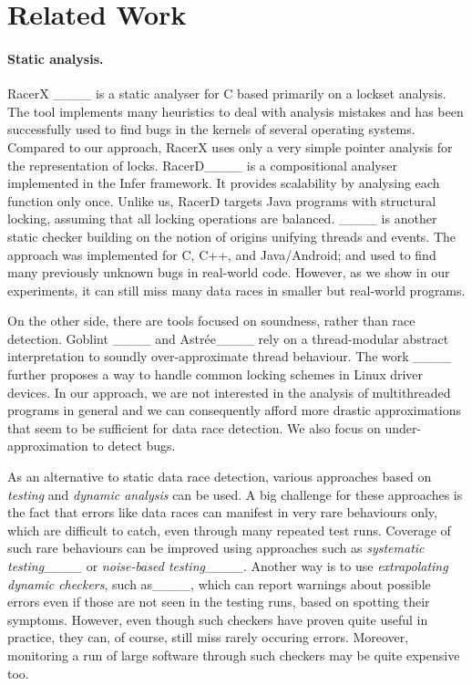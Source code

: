 \section{Related Work}
\vspace*{-1mm}

\paragraph{Static analysis.} RacerX ____ is a static analyser for C
based primarily on a lockset analysis. The tool implements many heuristics to
deal with analysis mistakes and has been successfully used to find bugs in the
kernels of several operating systems. Compared to our approach, RacerX uses only
a very simple pointer analysis for the representation of locks.
RacerD____ is a compositional analyser implemented in the Infer
framework. It provides scalability by analysing each function only once. Unlike
us, RacerD targets Java programs with structural locking, assuming that all
locking operations are balanced. \otwo ____ is another static checker
building on the notion of origins unifying threads and events. The approach was
implemented for C, C++, and Java/Android; and used to find many previously
unknown bugs in real-world code. However, as we show in our experiments, it can
still miss many data races in smaller but real-world programs.

On the other side, there are tools focused on soundness, rather than race
detection. Goblint ____ and Astrée____ rely on a
thread-modular abstract interpretation to soundly over-approximate thread
behaviour. The work ____ further proposes a way to handle common
locking schemes in Linux driver devices. In our approach, we are not interested
in the analysis of multithreaded programs in general and we can consequently
afford more drastic approximations that seem to be sufficient for data race
detection.  We also focus on under-approximation to detect bugs.

As an alternative to static data race detection, various approaches based on
\emph{testing} and \emph{dynamic analysis} can be used. A big challenge for
these approaches is the fact that errors like data races can manifest in very
rare behaviours only, which are difficult to catch, even through many repeated
test runs. Coverage of such rare behaviours can be improved using approaches
such as \emph{systematic testing}____ or \emph{noise-based
testing}____. Another way is to use
\emph{extrapolating dynamic checkers}, such
as____, which can report warnings about
possible errors even if those are not seen in the testing runs, based on
spotting their symptoms. However, even though such checkers have proven quite
useful in practice, they can, of course, still miss rarely occuring errors.
Moreover, monitoring a run of large software through such checkers may be quite
expensive too. 


